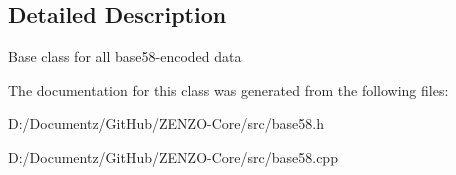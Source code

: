 \subsection{Detailed Description}
Base class for all base58-\/encoded data 

The documentation for this class was generated from the following files\+:\begin{DoxyCompactItemize}
\item 
D\+:/\+Documentz/\+Git\+Hub/\+Z\+E\+N\+Z\+O-\/\+Core/src/base58.\+h\item 
D\+:/\+Documentz/\+Git\+Hub/\+Z\+E\+N\+Z\+O-\/\+Core/src/base58.\+cpp\end{DoxyCompactItemize}
